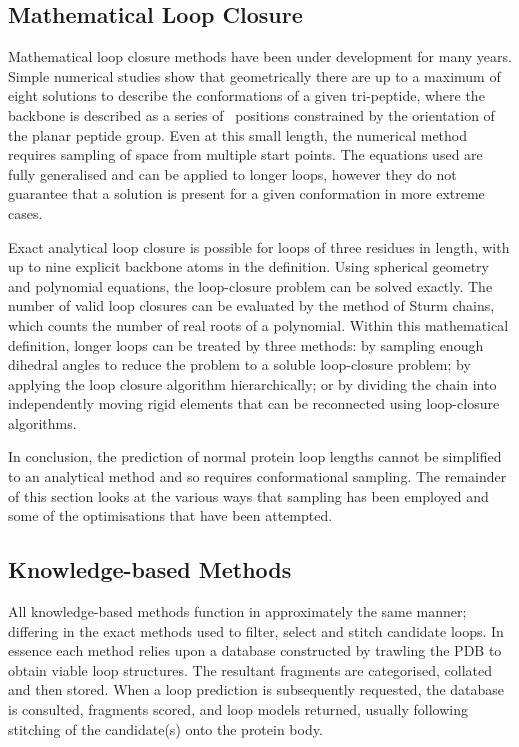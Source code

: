 \subsection{Mathematical Loop Closure}

Mathematical loop closure methods have been under development for many years. Simple numerical studies show that geometrically there are up to a maximum of eight solutions to describe the conformations of a given tri-peptide, where the backbone is described as a series of \ca\ positions constrained by the orientation of the planar peptide group\cite{METHOD:Go70}. Even at this small length, the numerical method requires sampling of space from multiple start points. The equations used are fully generalised and can be applied to longer loops, however they do not guarantee that a solution is present for a given conformation in more extreme cases. 

Exact analytical loop closure\cite{METHOD:Wed99} is possible for loops of three residues in length, with up to nine explicit backbone atoms in the definition. Using spherical geometry and polynomial equations, the loop-closure problem can be solved exactly. The number of valid loop closures can be evaluated by the method of Sturm chains, which counts the number of real roots of a polynomial. Within this mathematical definition, longer loops can be treated by three methods: by sampling enough dihedral angles to reduce the problem to a soluble loop-closure problem; by applying the loop closure algorithm hierarchically; or by dividing the chain into independently moving rigid elements that can be reconnected using loop-closure algorithms\cite{METHOD:DivideConquer}. 

In conclusion, the prediction of normal protein loop lengths cannot be simplified to an analytical  method and so requires conformational sampling. The remainder of this section looks at the various ways that sampling has been employed and some of the optimisations that have been attempted.






\subsection{Knowledge-based Methods}
\label{section:loop:database}
All knowledge-based methods function in approximately the same manner; differing in the exact methods used to filter, select and stitch candidate loops. In essence each method relies upon a database constructed by trawling the PDB to obtain viable loop structures. The resultant fragments are categorised, collated and then stored. When a loop prediction is subsequently requested, the database is consulted, fragments scored, and loop models returned, usually following stitching of the candidate(s) onto the protein body\cite{METHOD:Petra}. 




